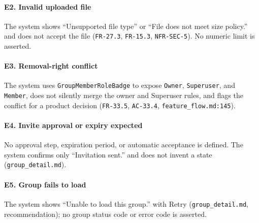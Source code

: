 \documentclass[12pt]{article}
\begin{document}
\hypertarget{sec:e2-invalid-uploaded-file}{}
\paragraph*{E2. Invalid uploaded file}
\par\medskip

The system shows “Unsupported file type” or “File does not meet size policy.” and does not accept the file (\texttt{FR-27.3}, \texttt{FR-15.3}, \texttt{NFR-SEC-5}). No numeric limit is asserted.
\par\medskip

\hypertarget{sec:e3-removal-right-conflict}{}
\paragraph*{E3. Removal-right conflict}
\par\medskip

The system uses \texttt{GroupMemberRoleBadge} to expose \texttt{Owner}, \texttt{Superuser}, and \texttt{Member}, does not silently merge the owner and Superuser rules, and flags the conflict for a product decision (\texttt{FR-33.5}, \texttt{AC-33.4}, \texttt{feature\_flow.md:145}).
\par\medskip

\hypertarget{sec:e4-invite-approval-or-expiry-expected}{}
\paragraph*{E4. Invite approval or expiry expected}
\par\medskip

No approval step, expiration period, or automatic acceptance is defined. The system confirms only “Invitation sent.” and does not invent a state (\texttt{group\_detail.md}).
\par\medskip

\hypertarget{sec:e5-group-fails-to-load}{}
\paragraph*{E5. Group fails to load}
\par\medskip

The system shows “Unable to load this group.” with Retry (\texttt{group\_detail.md}, recommendation); no group status code or error code is asserted.
\par\medskip

\hypertarget{sec:b7-business-rules}{}
\end{document}
